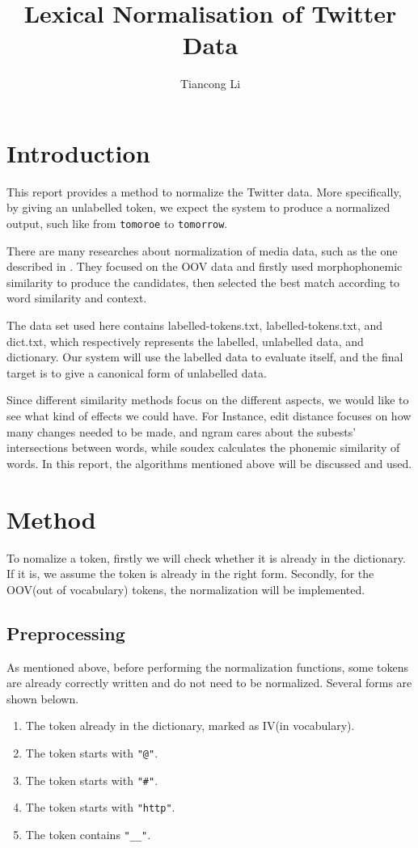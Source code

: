 \documentclass[11pt]{article}
\title{Lexical Normalisation of Twitter Data}
\author
{Tiancong Li}
\begin{document}
\maketitle



\section{Introduction}
This report provides a method to normalize the Twitter data.
More specifically, by giving an unlabelled token,
we expect the system to produce a normalized output,
such like from \texttt{tomoroe} to \texttt{tomorrow}.

There are many researches about normalization of media data, such as the one
described in \cite{Han:2013:LNS:2414425.2414430}.
They focused on the OOV data and firstly used morphophonemic similarity
to produce the candidates,
then selected the best match according to word similarity and context.

The data set used here contains labelled-tokens.txt, labelled-tokens.txt,
and dict.txt,
which respectively represents the labelled, unlabelled data, and dictionary.
Our system will use the labelled data to evaluate itself,
and the final target is to give a canonical form of unlabelled data.

Since different similarity methods focus on the different aspects,
we would like to see what kind of effects we could have.
For Instance, edit distance focuses on how many changes needed to be made,
and ngram cares about the subests' intersections between words,
while soudex calculates the phonemic similarity of words.
In this report, the algorithms mentioned above will be discussed and used.

\section{Method}
To nomalize a token, firstly we will check whether it is already in the dictionary.
If it is, we assume the token is already in the right form.
Secondly, for the OOV(out of vocabulary) tokens,
the normalization will be implemented.

\subsection{Preprocessing}
As mentioned above, before performing the normalization functions,
some tokens are already correctly written and do not need to be normalized.
Several forms are shown belown.
\begin{enumerate}
\item
The token already in the dictionary, marked as IV(in vocabulary).
\item
The token starts with \texttt{"@"}.
\item
The token starts with \texttt{"\#"}.
\item
The token starts with \texttt{"http"}.
\item
The token contains \texttt{"\_\_"}.
\end{enumerate}
\end{document}

